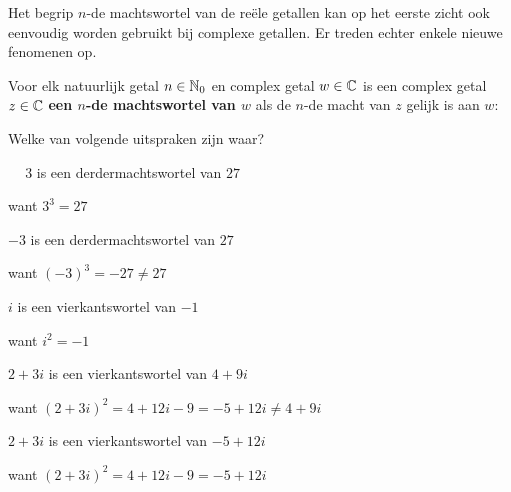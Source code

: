 \documentclass{ximera}
\begin{document}
    \author{Wim Obbels}
    \label{xim:complexe_machtswortels}

    \providecommand{\sg}{\phantom{+}}

    Het begrip $n$-de machtswortel van de reële getallen kan op het eerste zicht ook eenvoudig worden gebruikt bij complexe getallen. 
    Er treden echter enkele nieuwe fenomenen op.

    \begin{definition}\nl

    Voor elk natuurlijk getal $n\in \mathbb{N}_0$ en complex getal $w\in\mathbb{C}$ is een complex getal $z\in\mathbb{C}$ \textbf{een $n$-de machtswortel van $w$}  als de $n$-de macht van $z$ gelijk is aan $w$:
 

    \end{definition}



    \begin{example} Welke van volgende uitspraken zijn waar?
        \begin{question} 
            \choiceTrue  $\sg3$ is een derdermachtswortel van $27$
            \begin{feedback} want $3^3 = 27$\end{feedback}
        \end{question}
        \begin{question} 
            \choiceFalse  $-3$ is een derdermachtswortel van $27$
            \begin{feedback} want $(-3)^3 = -27 \neq 27 $\end{feedback}
        \end{question}
        \begin{question} 
            \choiceTrue  $i$ is een vierkantswortel van $-1$
            \begin{feedback} want $i^2= -1$\end{feedback}
        \end{question}
        \begin{question} 
            \choiceFalse  $2+3i$ is een vierkantswortel van $4+9i$
            \begin{feedback} want $(2+3i)^2 = 4 + 12i - 9 = -5+12i \neq 4+9i$\end{feedback}
        \end{question}
        \begin{question} 
            \choiceTrue  $2+3i$ is een vierkantswortel van $-5+12i$
            \begin{feedback} want $(2+3i)^2 = 4 + 12i - 9 = -5+12i$\end{feedback}
        \end{question}

    \end{example}
\end{document}
